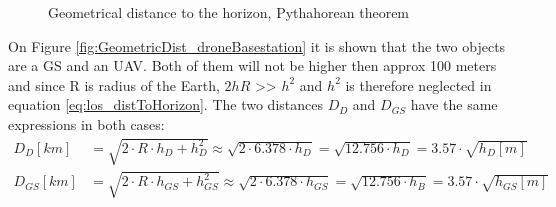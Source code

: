 \begin{figure}[H]
    \hfill
	\hfill
    \hfill
    \caption{Geometrical distance to the horizon, Pythahorean theorem}
\end{figure}

On Figure \ref{fig:GeometricDist_droneBasestation} it is shown that the two objects are a GS and an UAV. Both of them will not be higher then approx 100 meters and since R is radius of the Earth, $2hR$ >> $h^2$ and $h^2$ is therefore neglected in equation \ref{eq:los_distToHorizon}. The two distances $D_D$ and $D_{GS}$ have the same expressions in both cases:
\begin{align*}
	D_D [km] &= \sqrt{2\cdot R \cdot h_D + h_{D}^2} \approx \sqrt{2\cdot 6.378\cdot h_D} = \sqrt{12.756\cdot h_D} = 3.57\cdot \sqrt{h_D[m]} \\
	D_{GS} [km] &= \sqrt{2\cdot R \cdot h_{GS} + h_{GS}^2} \approx \sqrt{2\cdot 6.378\cdot h_{GS}} = \sqrt{12.756\cdot h_B} = 3.57\cdot \sqrt{h_{GS}[m]}
\end{align*}

